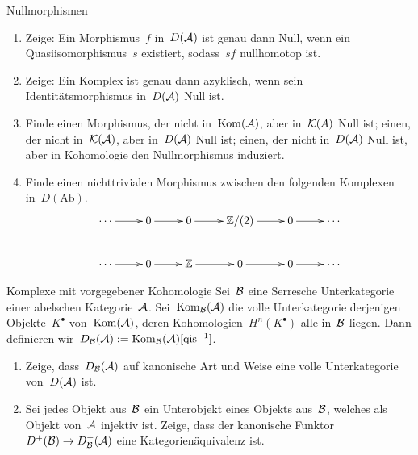 \documentclass{uebblatt}
\begin{document}

\begin{aufgabe}{Nullmorphismen}
\begin{enumerate}
\item Zeige: Ein Morphismus~$f$ in~$D(\mathcal{A})$ ist genau dann Null, wenn ein
Quasiisomorphismus~$s$ existiert, sodass~$sf$ nullhomotop ist.
\item Zeige: Ein Komplex ist genau dann azyklisch, wenn sein
Identitätsmorphismus in~$D(\mathcal{A})$ Null ist.
\item Finde einen Morphismus, der nicht in~$\mathrm{Kom}(\mathcal{A})$, aber in~$\mathcal{K}(A)$ Null
ist; einen, der nicht in~$\mathcal{K}(\mathcal{A})$, aber in~$D(\mathcal{A})$ Null ist; einen, der nicht
in~$D(\mathcal{A})$ Null ist, aber in Kohomologie den Nullmorphismus induziert.
\item Finde einen nichttrivialen Morphismus zwischen den folgenden Komplexen
in~$D(\mathrm{Ab})$.
\[ \xymatrix{
  \cdots \ar[r] & 0 \ar[r] & 0 \ar[r] & \ZZ/(2) \ar[r] & 0 \ar[r] & \cdots \\
  \cdots \ar[r] & 0 \ar[r] & \ZZ \ar[r] & 0 \ar[r] & 0 \ar[r] & \cdots
} \]
\end{enumerate}
\end{aufgabe}

\begin{aufgabe}{Komplexe mit vorgegebener Kohomologie}
Sei~$\mathcal{B}$ eine Serresche Unterkategorie einer abelschen Kategorie~$\mathcal{A}$.
Sei~$\mathrm{Kom}_{\mathcal{B}}(\mathcal{A})$ die volle Unterkategorie derjenigen Objekte~$K^\bullet$
von~$\mathrm{Kom}(\mathcal{A})$, deren Kohomologien~$H^n(K^\bullet)$ alle in~$\mathcal{B}$ liegen.
Dann definieren wir~$D_{\mathcal{B}}(\mathcal{A}) := \mathrm{Kom}_{\mathcal{B}}(\mathcal{A})[\text{qis}^{-1}]$.
\begin{enumerate}
\item Zeige, dass~$D_{\mathcal{B}}(\mathcal{A})$ auf kanonische Art und Weise eine volle
Unterkategorie von~$D(\mathcal{A})$ ist.
\item Sei jedes Objekt aus~$\mathcal{B}$ ein Unterobjekt eines Objekts aus~$\mathcal{B}$, welches
als Objekt von~$\mathcal{A}$ injektiv ist. Zeige, dass der kanonische Funktor~$D^+(\mathcal{B})
\to D^+_{\mathcal{B}}(\mathcal{A})$ eine Kategorienäquivalenz ist.
\end{enumerate}
\end{aufgabe}
\end{document}
